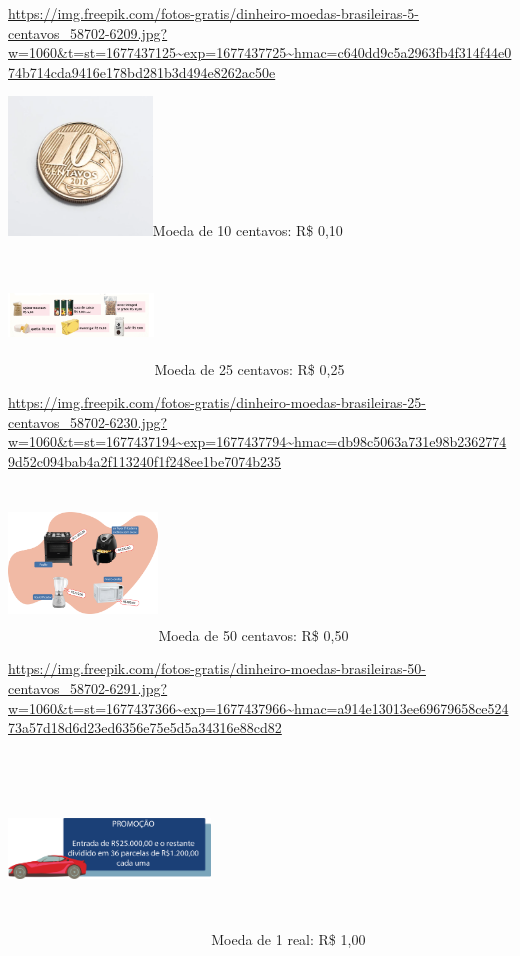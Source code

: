 \begin{escolha}
{\url{https://img.freepik.com/fotos-gratis/dinheiro-moedas-brasileiras-5-centavos_58702-6209.jpg?w=1060\&t=st=1677437125~exp=1677437725~hmac=c640dd9c5a2963fb4f314f44e074b714cda9416e178bd281b3d494e8262ac50e}

\includegraphics[width=1.50833in,height=1.45668in]{media/image65.png}Moeda
de 10 centavos: R\$ 0,10

\includegraphics[width=1.52500in,height=1.24749in]{media/image66.png}Moeda
de 25 centavos: R\$ 0,25

\url{https://img.freepik.com/fotos-gratis/dinheiro-moedas-brasileiras-25-centavos_58702-6230.jpg?w=1060\&t=st=1677437194~exp=1677437794~hmac=db98c5063a731e98b23627749d52c094bab4a2f113240f1f248ee1be7074b235}

\includegraphics[width=1.56667in,height=1.61849in]{media/image67.png}Moeda
de 50 centavos: R\$ 0,50

\url{https://img.freepik.com/fotos-gratis/dinheiro-moedas-brasileiras-50-centavos_58702-6291.jpg?w=1060\&t=st=1677437366~exp=1677437966~hmac=a914e13013ee69679658ce52473a57d18d6d23ed6356e75e5d5a34316e88cd82}

\includegraphics[width=2.11667in,height=2.01180in]{media/image68.png}Moeda
de 1 real: R\$ 1,00

}
\end{escolha}
